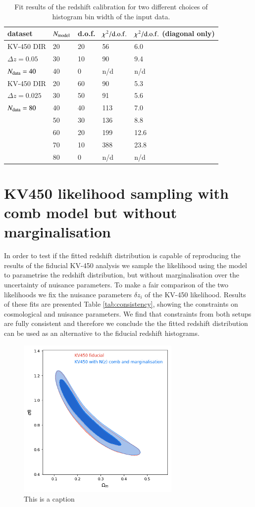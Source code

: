 \documentclass{aa}
\begin{document}
\begin{appendix}
\begin{table}
\label{tab:redshift_calibration}
\begin{tabular}{lllll}
\hline
dataset & $N_{\rm model}$ & d.o.f. & $\chi^2/{\rm d.o.f.}$& $\chi^2/{\rm d.o.f.}$ (diagonal only)\\
\hline
KV-450 DIR&20&20&56&6.0\\
$\Delta z = 0.05$&30&10&90&9.4\\
$N_{\rm data} = 40$&40&0&n/d&n/d\\
\hline
KV-450 DIR&20&60&90&5.3\\
$\Delta z = 0.025$&30&50&91&5.6\\
$N_{\rm data} = 80$&40&40&113&7.0\\
&50&30&136&8.8\\
&60&20&199&12.6\\
&70&10&388&23.8\\
&80&0&n/d&n/d\\
\hline
\end{tabular}
\caption{Fit results of the redshift calibration for two different choices of histogram bin width of the input data. }
\end{table}
\section{KV450 likelihood sampling with comb model but without marginalisation}
\label{ap:kv450_likelihood}
In order to test if the fitted redshift distribution is capable of reproducing the results of the fiducial KV-450 analysis we sample the likelihood using the model to parametrise the redshift distribution, but without marginalisation over the uncertainty of nuisance parameters. To make a fair comparison of the two likelihoods we fix the nuisance parameters $\delta z_i$ of the KV-450 likelihood. Results of these fits are presented Table \ref{tab:consistency}, showing the constraints on cosmological and nuisance parameters. We find that constraints from both setups are fully consistent and therefore we conclude the the fitted redshift distribution can be used as an alternative to the fiducial redshift histograms.

\begin{figure}
\centering
\includegraphics[scale=0.5]{plots/Om_s8.png}
\caption{{\color{red} This is a caption}}
\label{fig:Om_s8_consistency}
\end{figure}


\end{appendix}
\end{document}
